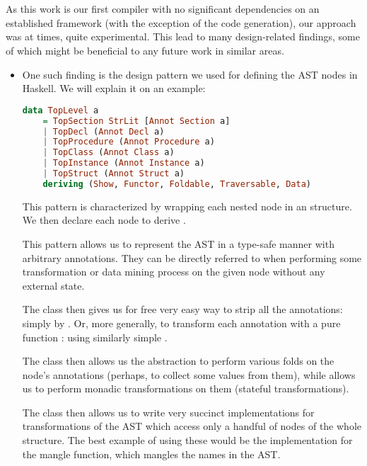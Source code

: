 \section{}

As this work is our first compiler with no significant dependencies on an established framework (with the exception of the code generation), our approach was at times, quite experimental. This lead to many design-related findings, some of which might be beneficial to any future work in similar areas.

\begin{itemize}
    \item One such finding is the design pattern we used for defining the AST nodes in Haskell. We will explain it on an example:

    \begin{lstlisting}[language=Haskell]
data TopLevel a
    = TopSection StrLit [Annot Section a]
    | TopDecl (Annot Decl a)
    | TopProcedure (Annot Procedure a)
    | TopClass (Annot Class a)
    | TopInstance (Annot Instance a)
    | TopStruct (Annot Struct a)
    deriving (Show, Functor, Foldable, Traversable, Data)
    \end{lstlisting}

    This pattern is characterized by wrapping each nested node  in an  structure. We then declare each node to derive \linebreak{}.

    This pattern allows us to represent the AST in a type-safe manner with arbitrary annotations. They can be directly referred to when performing some transformation or data mining process on the given node without  any external state.

    The  class then gives us for free very easy way to strip all the annotations: simply by . Or, more generally, to transform each annotation with a pure function : using similarly simple .

    The  class then allows us the abstraction to perform various folds on the node's annotations (perhaps, to collect some values from them), while  allows us to perform monadic transformations on them (stateful transformations).

    The  class then allows us to write very succinct implementations for transformations of the AST which access only a handful of nodes of the whole structure. The best example of using these would be the implementation for the mangle function, which mangles the names in the AST.


\end{itemize}
